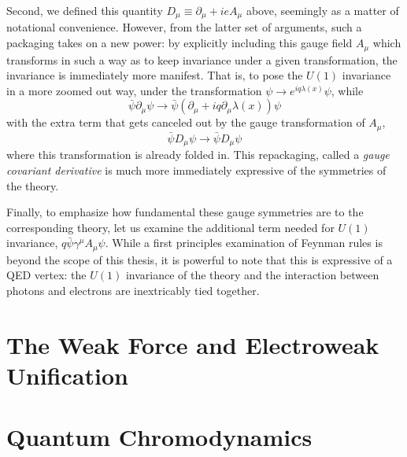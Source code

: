 Second, we defined this quantity $D_{\mu} \equiv \partial_{\mu} + ieA_{\mu}$ above, seemingly as a matter 
of notational convenience. However, from the latter set of arguments, such a packaging takes on a new power: 
by explicitly including this gauge field $A_{\mu}$ which transforms in such a way as to keep invariance 
under a given transformation, the invariance is immediately more manifest. That is, to pose the $U(1)$ 
invariance in a more zoomed out way, under the transformation $\psi\rightarrow e^{iq\lambda(x)}\psi$,
while
\begin{equation}
\bar{\psi}\partial_{\mu}\psi \rightarrow \bar{\psi}(\partial_{\mu}+iq\partial_{\mu}\lambda(x))\psi
\end{equation}
with the extra term that gets canceled out by the gauge transformation of $A_{\mu}$,
\begin{equation}
\bar{\psi}D_{\mu}\psi \rightarrow \bar{\psi}D_{\mu}\psi
\end{equation}
where this transformation is already folded in. This repackaging, called a \emph{gauge covariant derivative} 
is much more immediately expressive of the symmetries of the theory.

Finally, to emphasize how fundamental these gauge symmetries are to the corresponding theory, let us examine
the additional term needed for $U(1)$ invariance, $q\bar{\psi}\gamma^{\mu}A_{\mu}\psi$. While a first principles
examination of Feynman rules is beyond the scope of this thesis, it is powerful to note that this is expressive 
of a QED vertex: the $U(1)$ invariance of the theory and the interaction between photons and electrons are 
inextricably tied together.

\section{The Weak Force and Electroweak Unification}


\section{Quantum Chromodynamics}





